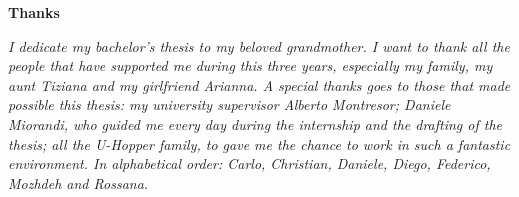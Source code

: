 \thispagestyle{empty}

\begin{center}
  {\bf \Huge Thanks}
\end{center}

\vspace{4cm}


\emph{
I dedicate my bachelor's thesis to my beloved grandmother. I want to thank all the people that have supported me during this three years, especially my family, my aunt Tiziana and my girlfriend Arianna. A special thanks goes to those that made possible this thesis: my university supervisor Alberto Montresor; Daniele Miorandi, who guided me every day during the internship and the drafting of the thesis; all the U-Hopper family, to gave me the chance to work in such a fantastic environment. In alphabetical order: Carlo, Christian, Daniele, Diego, Federico, Mozhdeh and Rossana.
}
